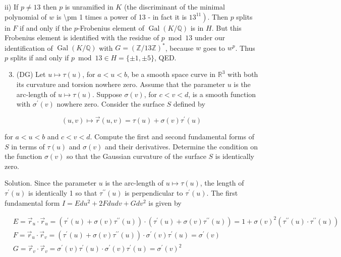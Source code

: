 \documentclass[10pt]{article}
\begin{document}
ii) If $p \neq 13$ then $p$ is unramified in $K$ (the discriminant of the minimal
polynomial of $w$ is \textbackslash pm 1 times a power of 13 - in fact it is $\left.13^{11}\right)$. Then $p$ splits in $F$ if and only if the $p$-Frobenius element of $\operatorname{Gal}(K / \mathbb{Q})$ is in $H$. But this Frobenius element is identified with the residue of $p \bmod 13$ under our identification of $\operatorname{Gal}(K / \mathbb{Q})$ with $G=(\mathbb{Z} / 13 \mathbb{Z})^{*}$, because $w$ goes to $w^{p}$. Thus $p$ splits if and only if $p \bmod 13 \in H=\{ \pm 1, \pm 5\}$, QED.

\begin{enumerate}
  \setcounter{enumi}{2}
  \item (DG) Let $u \mapsto \tau(u)$, for $a<u<b$, be a smooth space curve in $\mathbb{R}^{3}$ with both its curvature and torsion nowhere zero. Assume that the parameter $u$ is the arc-length of $u \mapsto \tau(u)$. Suppose $\sigma(v)$, for $c<v<d$, is a smooth function with $\sigma^{\prime}(v)$ nowhere zero. Consider the surface $S$ defined by
\end{enumerate}

$$
(u, v) \mapsto \vec{r}(u, v)=\tau(u)+\sigma(v) \tau^{\prime}(u)
$$

for $a<u<b$ and $c<v<d$. Compute the first and second fundamental forms of $S$ in terms of $\tau(u)$ and $\sigma(v)$ and their derivatives. Determine the condition on the function $\sigma(v)$ so that the Gaussian curvature of the surface $S$ is identically zero.

Solution. Since the parameter $u$ is the arc-length of $u \mapsto \tau(u)$, the length of $\tau^{\prime}(u)$ is identically 1 so that $\tau^{\prime \prime}(u)$ is perpendicular to $\tau^{\prime}(u)$. The first fundamental form $I=E d u^{2}+2 F d u d v+G d v^{2}$ is given by

$$
\begin{aligned}
& E=\vec{r}_{u} \cdot \vec{r}_{u}=\left(\tau^{\prime}(u)+\sigma(v) \tau^{\prime \prime}(u)\right) \cdot\left(\tau^{\prime}(u)+\sigma(v) \tau^{\prime \prime}(u)\right)=1+\sigma(v)^{2}\left(\tau^{\prime \prime}(u) \cdot \tau^{\prime \prime}(u)\right) \\
& F=\vec{r}_{u} \cdot \vec{r}_{v}=\left(\tau^{\prime}(u)+\sigma(v) \tau^{\prime \prime}(u)\right) \cdot \sigma^{\prime}(v) \tau^{\prime}(u)=\sigma^{\prime}(v) \\
& G=\vec{r}_{v} \cdot \vec{r}_{v}=\sigma^{\prime}(v) \tau^{\prime}(u) \cdot \sigma^{\prime}(v) \tau^{\prime}(u)=\sigma^{\prime}(v)^{2}
\end{aligned}
$$
\end{document}
